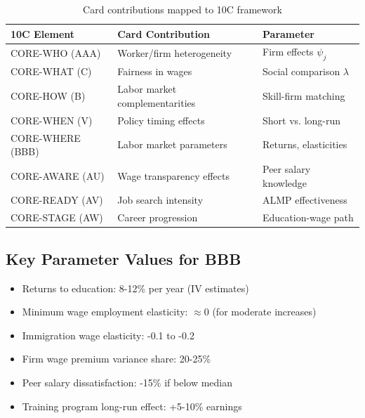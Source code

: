 \begin{table}[h]
\centering
\begin{tabular}{lll}
\textbf{10C Element} & \textbf{Card Contribution} & \textbf{Parameter} \\
\hline
CORE-WHO (AAA) & Worker/firm heterogeneity & Firm effects $\psi_j$ \\
CORE-WHAT (C) & Fairness in wages & Social comparison $\lambda$ \\
CORE-HOW (B) & Labor market complementarities & Skill-firm matching \\
CORE-WHEN (V) & Policy timing effects & Short vs. long-run \\
CORE-WHERE (BBB) & Labor market parameters & Returns, elasticities \\
CORE-AWARE (AU) & Wage transparency effects & Peer salary knowledge \\
CORE-READY (AV) & Job search intensity & ALMP effectiveness \\
CORE-STAGE (AW) & Career progression & Education-wage path \\
\end{tabular}
\caption{Card contributions mapped to 10C framework}
\end{table}

\subsection{Key Parameter Values for BBB}

\begin{tcolorbox}[colback=green!5!white, colframe=green!75!black, title=Card Parameters for BBB Repository]
\begin{itemize}
    \item Returns to education: 8-12\% per year (IV estimates)
    \item Minimum wage employment elasticity: $\approx 0$ (for moderate increases)
    \item Immigration wage elasticity: -0.1 to -0.2
    \item Firm wage premium variance share: 20-25\%
    \item Peer salary dissatisfaction: -15\% if below median
    \item Training program long-run effect: +5-10\% earnings
\end{itemize}
\end{tcolorbox}

